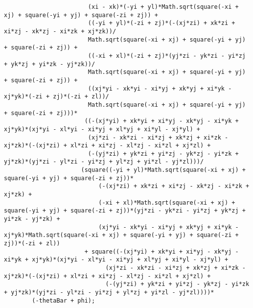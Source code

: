 \begin{lstlisting}
						(xi - xk)*(-yi + yl)*Math.sqrt(square(-xi + xj) + square(-yi + yj) + square(-zi + zj)) + 
						((-yi + yl)*(-zi + zj)*(-(xj*zi) + xk*zi + xi*zj - xk*zj - xi*zk + xj*zk))/
						Math.sqrt(square(-xi + xj) + square(-yi + yj) + square(-zi + zj)) + 
						((-xi + xl)*(-zi + zj)*(yj*zi - yk*zi - yi*zj + yk*zj + yi*zk - yj*zk))/
						Math.sqrt(square(-xi + xj) + square(-yi + yj) + square(-zi + zj)) + 
						((xj*yi - xk*yi - xi*yj + xk*yj + xi*yk - xj*yk)*(-zi + zj)*(-zi + zl))/
						Math.sqrt(square(-xi + xj) + square(-yi + yj) + square(-zi + zj)))*
					   ((-(xj*yi) + xk*yi + xi*yj - xk*yj - xi*yk + xj*yk)*(xj*yi - xl*yi - xi*yj + xl*yj + xi*yl - xj*yl) + 
						(xj*zi - xk*zi - xi*zj + xk*zj + xi*zk - xj*zk)*(-(xj*zi) + xl*zi + xi*zj - xl*zj - xi*zl + xj*zl) + 
						(-(yj*zi) + yk*zi + yi*zj - yk*zj - yi*zk + yj*zk)*(yj*zi - yl*zi - yi*zj + yl*zj + yi*zl - yj*zl)))/
					  (square((-yi + yl)*Math.sqrt(square(-xi + xj) + square(-yi + yj) + square(-zi + zj))*
						   (-(xj*zi) + xk*zi + xi*zj - xk*zj - xi*zk + xj*zk) + 
						   (-xi + xl)*Math.sqrt(square(-xi + xj) + square(-yi + yj) + square(-zi + zj))*(yj*zi - yk*zi - yi*zj + yk*zj + yi*zk - yj*zk) + 
						   (xj*yi - xk*yi - xi*yj + xk*yj + xi*yk - xj*yk)*Math.sqrt(square(-xi + xj) + square(-yi + yj) + square(-zi + zj))*(-zi + zl))
					   + square((-(xj*yi) + xk*yi + xi*yj - xk*yj - xi*yk + xj*yk)*(xj*yi - xl*yi - xi*yj + xl*yj + xi*yl - xj*yl) + 
							 (xj*zi - xk*zi - xi*zj + xk*zj + xi*zk - xj*zk)*(-(xj*zi) + xl*zi + xi*zj - xl*zj - xi*zl + xj*zl) + 
							 (-(yj*zi) + yk*zi + yi*zj - yk*zj - yi*zk + yj*zk)*(yj*zi - yl*zi - yi*zj + yl*zj + yi*zl - yj*zl))))*
		(-thetaBar + phi);
		

\end{lstlisting}
